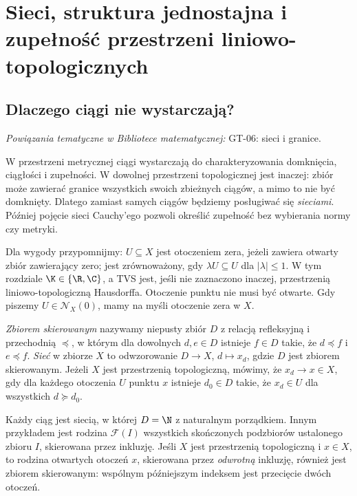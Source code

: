 \bigskip
\setcounter{section}{2}
\section{Sieci, struktura jednostajna i zupełność przestrzeni liniowo-topologicznych}\label{sec:zupelnosc}

\providecommand{\atlasref}[2]{#2}


\subsection{Dlaczego ciągi nie wystarczają?}

\noindent\emph{Powiązania tematyczne w Bibliotece matematycznej:} \atlasref{GT-06::def:topog-siec-granica}{GT-06: sieci i granice}.


W przestrzeni metrycznej ciągi wystarczają do charakteryzowania domknięcia,
ciągłości i zupełności. W dowolnej przestrzeni topologicznej jest inaczej:
zbiór może zawierać granice wszystkich swoich zbieżnych ciągów, a mimo to
nie być domknięty. Dlatego zamiast samych ciągów będziemy posługiwać się
\emph{sieciami}. Później pojęcie sieci Cauchy'ego pozwoli określić
zupełność bez wybierania normy czy metryki.

Dla wygody przypomnijmy: $U\subseteq X$ jest otoczeniem
zera, jeżeli zawiera otwarty zbiór zawierający zero;
jest zrównoważony, gdy $\lambda U\subseteq U$
dla $|\lambda|\leq1$.
W tym rozdziale $\K\in\{\R,\C\}$, a TVS jest, jeśli nie zaznaczono
inaczej, przestrzenią liniowo-topologiczną Hausdorffa. Otoczenie punktu
nie musi być otwarte. Gdy piszemy $U\in\mathcal N_X(0)$, mamy na myśli
otoczenie zera w $X$.

\begin{definicja}\label{def:net}
\emph{Zbiorem skierowanym} nazywamy niepusty zbiór $D$ z relacją
refleksyjną i przechodnią $\preceq$, w którym dla dowolnych $d,e\in D$
istnieje $f\in D$ takie, że $d\preceq f$ i $e\preceq f$.
\emph{Sieć} w zbiorze $X$ to odwzorowanie $D\to X$,
$d\mapsto x_d$, gdzie $D$ jest zbiorem skierowanym.
Jeżeli $X$ jest przestrzenią topologiczną, mówimy, że $x_d\to x\in X$,
gdy dla każdego otoczenia $U$ punktu $x$ istnieje $d_0\in D$ takie,
że $x_d\in U$ dla wszystkich $d\succeq d_0$.
\end{definicja}

Każdy ciąg jest siecią, w której $D=\N$ z naturalnym porządkiem.
Innym przykładem jest rodzina $\mathcal F(I)$ wszystkich skończonych
podzbiorów ustalonego zbioru $I$, skierowana przez inkluzję.
Jeśli $X$ jest przestrzenią topologiczną i $x\in X$, to rodzina
otwartych otoczeń $x$, skierowana przez \emph{odwrotną} inkluzję,
również jest zbiorem skierowanym: wspólnym późniejszym indeksem
jest przecięcie dwóch otoczeń.

